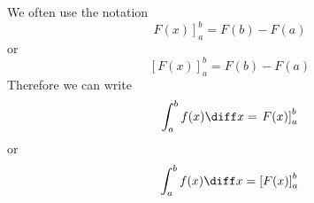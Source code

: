 \begin{frame}
We often use the notation
\[
\left. F(x)\right]_a^b = F(b)-F(a)
\]
or 
\[
\left[ F(x)\right]_a^b = F(b)-F(a)
\]
Therefore we can write
\[
\int_a^b f(x) \diff x = \left. F(x)\right]_a^b
\]
or
\[
\int_a^b f(x) \diff x = \left[ F(x)\right]_a^b
\]
\end{frame}
